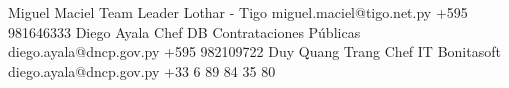 %
%
%



\begin{referees}
		{Miguel Maciel}
		{Team Leader}
		{Lothar - Tigo}
		{miguel.maciel@tigo.net.py}
		{+595 981646333}
		{Diego Ayala}
		{Chef DB}
		{Contrataciones Públicas}
		{diego.ayala@dncp.gov.py}
		{+595 982109722}
		{Duy Quang Trang}
		{Chef IT}
		{Bonitasoft}
		{diego.ayala@dncp.gov.py}
		{+33 6 89 84 35 80‬}
\end{referees}